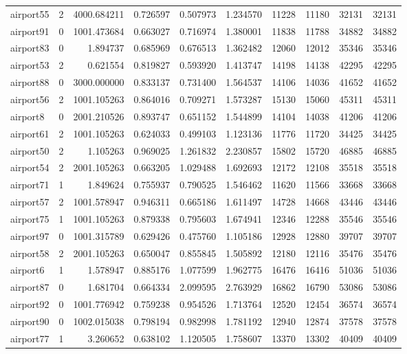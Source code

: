 \begin{longtable}{|l|r|r|r|r|r|r|r|r|r|}
airport55 & 2 & 4000.684211 & 0.726597 & 0.507973 & 1.234570 & 11228 & 11180 & 32131 & 32131 \\
airport91 & 0 & 1001.473684 & 0.663027 & 0.716974 & 1.380001 & 11838 & 11788 & 34882 & 34882 \\
airport83 & 0 & 1.894737 & 0.685969 & 0.676513 & 1.362482 & 12060 & 12012 & 35346 & 35346 \\
airport53 & 2 & 0.621554 & 0.819827 & 0.593920 & 1.413747 & 14198 & 14138 & 42295 & 42295 \\
airport88 & 0 & 3000.000000 & 0.833137 & 0.731400 & 1.564537 & 14106 & 14036 & 41652 & 41652 \\
airport56 & 2 & 1001.105263 & 0.864016 & 0.709271 & 1.573287 & 15130 & 15060 & 45311 & 45311 \\
airport8 & 0 & 2001.210526 & 0.893747 & 0.651152 & 1.544899 & 14104 & 14038 & 41206 & 41206 \\
airport61 & 2 & 1001.105263 & 0.624033 & 0.499103 & 1.123136 & 11776 & 11720 & 34425 & 34425 \\
airport50 & 2 & 1.105263 & 0.969025 & 1.261832 & 2.230857 & 15802 & 15720 & 46885 & 46885 \\
airport54 & 2 & 2001.105263 & 0.663205 & 1.029488 & 1.692693 & 12172 & 12108 & 35518 & 35518 \\
airport71 & 1 & 1.849624 & 0.755937 & 0.790525 & 1.546462 & 11620 & 11566 & 33668 & 33668 \\
airport57 & 2 & 1001.578947 & 0.946311 & 0.665186 & 1.611497 & 14728 & 14668 & 43446 & 43446 \\
airport75 & 1 & 1001.105263 & 0.879338 & 0.795603 & 1.674941 & 12346 & 12288 & 35546 & 35546 \\
airport97 & 0 & 1001.315789 & 0.629426 & 0.475760 & 1.105186 & 12928 & 12880 & 39707 & 39707 \\
airport58 & 2 & 2001.105263 & 0.650047 & 0.855845 & 1.505892 & 12180 & 12116 & 35476 & 35476 \\
airport6 & 1 & 1.578947 & 0.885176 & 1.077599 & 1.962775 & 16476 & 16416 & 51036 & 51036 \\
airport87 & 0 & 1.681704 & 0.664334 & 2.099595 & 2.763929 & 16862 & 16790 & 53086 & 53086 \\
airport92 & 0 & 1001.776942 & 0.759238 & 0.954526 & 1.713764 & 12520 & 12454 & 36574 & 36574 \\
airport90 & 0 & 1002.015038 & 0.798194 & 0.982998 & 1.781192 & 12940 & 12874 & 37578 & 37578 \\
airport77 & 1 & 3.260652 & 0.638102 & 1.120505 & 1.758607 & 13370 & 13302 & 40409 & 40409 \\

\end{longtable}
